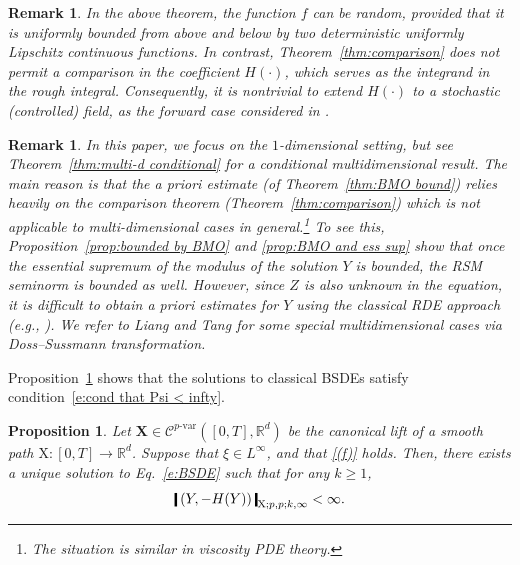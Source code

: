 \documentclass[11pt,reqno]{amsart}
\newtheorem{remark}[lemma]{Remark}
\newtheorem{proposition}[lemma]{Proposition}
\numberwithin{equation}{section}
\def\R{\mathbb R}
\newcommand{\shortthickbar}{%
  \vcenter{\hbox{\rule{1.8pt}{2.2ex}}}%
}
\newcommand{\thicknm}[1]{%
  \mathopen{\shortthickbar}%
  \mkern4mu #1 \mkern4mu%
  \mathclose{\shortthickbar}%
}
\begin{document}
\begin{remark}\label{rem:deterministic}
In the above theorem, the function $f$ can be random, provided that it is uniformly bounded from above and below by two deterministic uniformly Lipschitz continuous functions. In contrast, Theorem~\ref{thm:comparison} does not permit a comparison in the coefficient $H(\bm\cdot)$, which serves as the integrand in the rough integral. Consequently, it is nontrivial to extend  $H(\bm\cdot)$ to a stochastic (controlled) field, as the forward case considered in \cite{fhl21,allan2024rough}.
\end{remark}

\begin{remark}\label{rem:Why 1-d}
In this paper, we focus on the $1$-dimensional setting, but see Theorem~\ref{thm:multi-d conditional} for a conditional multidimensional result. The main reason is that the \emph{a priori} estimate (of Theorem~\ref{thm:BMO bound}) relies heavily on the comparison theorem (Theorem~\ref{thm:comparison}) which is not applicable to multi-dimensional cases in general.\footnote{The situation is similar in viscosity PDE theory.}
To see this, Proposition~\ref{prop:bounded by BMO} and \ref{prop:BMO and ess sup} show that once the essential supremum of the modulus of the solution $Y$ is bounded, the \emph{RSM} seminorm is bounded as well. However, since $Z$ is also unknown in the equation, it is difficult to obtain \emph{a priori} estimates for $Y$ using the classical \emph{RDE} approach (e.g., \cite[Proposition~8.2]{friz2020course}). We refer to Liang and Tang \cite{liang2025multidimensional} for some special multidimensional cases via Doss--Sussmann transformation.
\end{remark}


Proposition~\ref{prop:classical BSDEs} shows that the solutions to classical BSDEs satisfy condition~\eqref{e:cond that Psi < infty}.

\begin{proposition}\label{prop:classical BSDEs}
Let $\mathbf X \in \mathscr{C}^{p\text{-}\mathrm{var}}([0,T],\R^d)$ be the canonical lift of a smooth path $\mathrm X: [0,T]\to \R^d$. Suppose that $\xi \in L^{\infty}$, and that \ref{(f)} holds. 
Then, there exists a unique solution to Eq.~\eqref{e:BSDE} such that for any $k\ge 1$,
\begin{equation}\label{e:quadratic integrability}
\thicknm{(Y,-H(Y))}_{\mathrm X;p,p;k,\infty}< \infty.
\end{equation}
\end{proposition}
\end{document}
